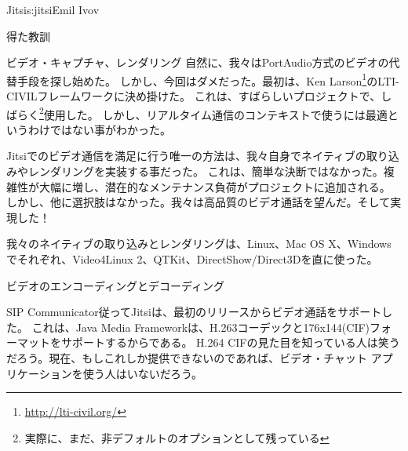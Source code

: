\begin{aosachapter}{Jitsi}{s:jitsi}{Emil Ivov}
\begin{aosasect1}{得た教訓}
\begin{aosasect2}{ビデオ・キャプチャ、レンダリング}
自然に、我々はPortAudio方式のビデオの代替手段を探し始めた。
しかし、今回はダメだった。最初は、Ken Larson\footnote{\url{http://lti-civil.org/}}のLTI-CIVILフレームワークに決め掛けた。
これは、すばらしいプロジェクトで、しばらく\footnote{実際に、まだ、非デフォルトのオプションとして残っている}使用した。
しかし、リアルタイム通信のコンテキストで使うには最適というわけではない事がわかった。

Jitsiでのビデオ通信を満足に行う唯一の方法は、我々自身でネイティブの取り込みやレンダリングを実装する事だった。
これは、簡単な決断ではなかった。複雑性が大幅に増し、潜在的なメンテナンス負荷がプロジェクトに追加される。
しかし、他に選択肢はなかった。我々は高品質のビデオ通話を望んだ。そして実現した！

我々のネイティブの取り込みとレンダリングは、Linux、Mac OS X、Windowsでそれぞれ、Video4Linux 2、QTKit、DirectShow/Direct3Dを直に使った。

\end{aosasect2}

\begin{aosasect2}{ビデオのエンコーディングとデコーディング}

SIP Communicator従ってJitsiは、最初のリリースからビデオ通話をサポートした。
これは、Java Media Frameworkは、H.263コーデックと176x144(CIF)フォーマットをサポートするからである。
H.264 CIFの見た目を知っている人は笑うだろう。現在、もしこれしか提供できないのであれば、ビデオ・チャット アプリケーションを使う人はいないだろう。


\end{aosasect2}
\end{aosasect1}
\end{aosachapter}

